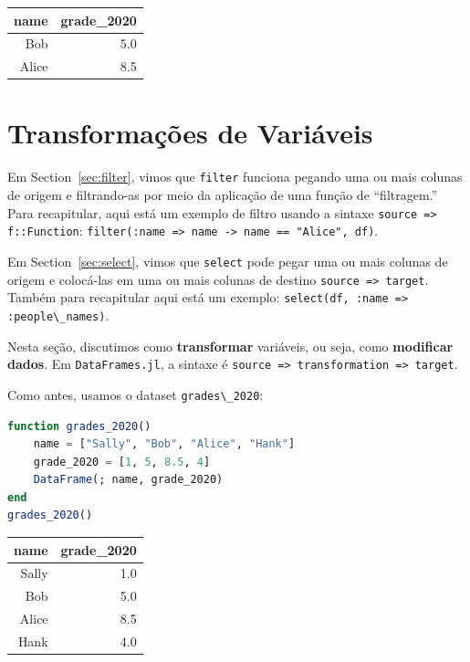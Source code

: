 \documentclass[
  notoc %
]{tufte-book}
\newcommand{\passthrough}[1]{#1}
\begin{document}
\begin{longtable}[]{@{}rr@{}}
\toprule
name & grade\_2020 \\
\midrule
\endhead
Bob & 5.0 \\
Alice & 8.5 \\
\bottomrule
\end{longtable}

\hypertarget{transformauxe7uxf5es-de-variuxe1veis}{%
\section{Transformações de
Variáveis}\label{transformauxe7uxf5es-de-variuxe1veis}}

Em Section~\ref{sec:filter}, vimos que \passthrough{\lstinline!filter!}
funciona pegando uma ou mais colunas de origem e filtrando-as por meio
da aplicação de uma função de ``filtragem.'' Para recapitular, aqui está
um exemplo de filtro usando a sintaxe
\passthrough{\lstinline!source => f::Function!}:
\passthrough{\lstinline!filter(:name => name -> name == "Alice", df)!}.

Em Section~\ref{sec:select}, vimos que \passthrough{\lstinline!select!}
pode pegar uma ou mais colunas de origem e colocá-las em uma ou mais
colunas de destino \passthrough{\lstinline!source => target!}. Também
para recapitular aqui está um exemplo:
\passthrough{\lstinline!select(df, :name => :people\_names)!}.

Nesta seção, discutimos como \textbf{transformar} variáveis, ou seja,
como \textbf{modificar dados}. Em
\passthrough{\lstinline!DataFrames.jl!}, a sintaxe é
\passthrough{\lstinline!source => transformation => target!}.

Como antes, usamos o dataset \passthrough{\lstinline!grades\_2020!}:

\begin{lstlisting}[language=Julia]
function grades_2020()
    name = ["Sally", "Bob", "Alice", "Hank"]
    grade_2020 = [1, 5, 8.5, 4]
    DataFrame(; name, grade_2020)
end
grades_2020()
\end{lstlisting}

\begin{longtable}[]{@{}rr@{}}
\toprule
name & grade\_2020 \\
\midrule
\endhead
Sally & 1.0 \\
Bob & 5.0 \\
Alice & 8.5 \\
Hank & 4.0 \\
\bottomrule
\end{longtable}
\end{document}
